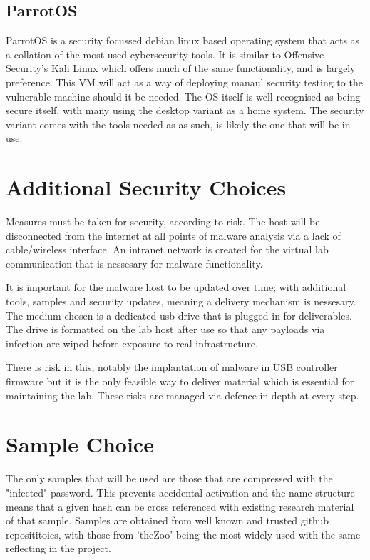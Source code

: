 \subsection{ParrotOS}
ParrotOS is a security focussed debian linux based operating system that acts as a collation of the most used cybersecurity tools. It is similar to Offensive Security's Kali Linux which offers much of the same functionality, and is largely preference. This VM will act as a way of deploying manaul security testing to the vulnerable machine should it be needed. The OS itself is well recognised as being secure itself, with many using the desktop variant as a home system. The security variant comes with the tools needed as as such, is likely the one that will be in use.


\section{Additional Security Choices}
Measures must be taken for security, according to risk. The host will be disconnected from the internet at all points of malware analysis via a lack of cable/wireless interface. An intranet network is created for the virtual lab communication that is nessesary for malware functionality.

It is important for the malware host to be updated over time; with additional tools, samples and security updates, meaning a delivery mechanism is nessesary. The medium chosen is a dedicated usb drive that is plugged in for deliverables. The drive is formatted on the lab host after use so that 
any payloads via infection are wiped before exposure to real infrastructure. 

There is risk in this, notably the implantation of malware in USB controller firmware but it is the only feasible way to deliver material which is essential for maintaining the lab. These risks are managed via defence in depth at every step.


\section{Sample Choice}
The only samples that will be used are those that are compressed with the "infected" password. This prevents accidental activation and the name structure means that a given hash can be cross referenced with existing research material of that sample. 
Samples are obtained from well known and trusted github reposititoies, with those from 'theZoo' being the most widely used with the same reflecting in the project.


